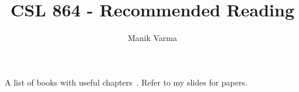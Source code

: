 \documentclass[a4paper,12pt]{article}
\def\mylatexhomedir{/cygdrive/C/Data/CommonCode/Latex/COMTools/}
\begin{document}
\title{CSL 864 - Recommended Reading}
\author{Manik Varma}
\maketitle

A list of books with useful chapters~\cite{Bishop06, Boyd04,
Bertsekas99, Cristianini00, Duda01, Mitchell97, Scholkopf02}.  Refer
to my slides for papers.



\end{document}
